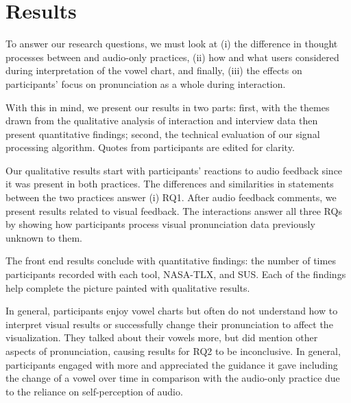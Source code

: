 \section{Results}
To answer our research questions, we must look at (i) the difference in thought processes between \visowel{} and audio-only practices, (ii) how and what users considered during interpretation of the vowel chart, and finally, (iii) the effects on participants' focus on pronunciation as a whole during \visowel{} interaction. 

With this in mind, we present our results in two parts: first, with the themes drawn from the qualitative analysis of interaction and interview data then present quantitative findings; second, the technical evaluation of our signal processing algorithm. Quotes from participants are edited for clarity.

Our qualitative results start with participants' reactions to audio feedback since it was present in both practices. The differences and similarities in statements between the two practices answer (i) RQ1. After audio feedback comments, we present results related to visual feedback. The interactions answer all three RQs by showing how participants process visual pronunciation data previously unknown to them. 

The front end results conclude with quantitative findings: the number of times participants recorded with each tool, NASA-TLX, and SUS. Each of the findings help complete the picture painted with qualitative results. 

In general, participants enjoy vowel charts but often do not understand how to interpret visual results or successfully change their pronunciation to affect the visualization. They talked about their vowels more, but did mention other aspects of pronunciation, causing results for RQ2 to be inconclusive. In general, participants engaged with \visowel{} more and appreciated the guidance it gave including the change of a vowel over time in comparison with the audio-only practice due to the reliance on self-perception of audio.





